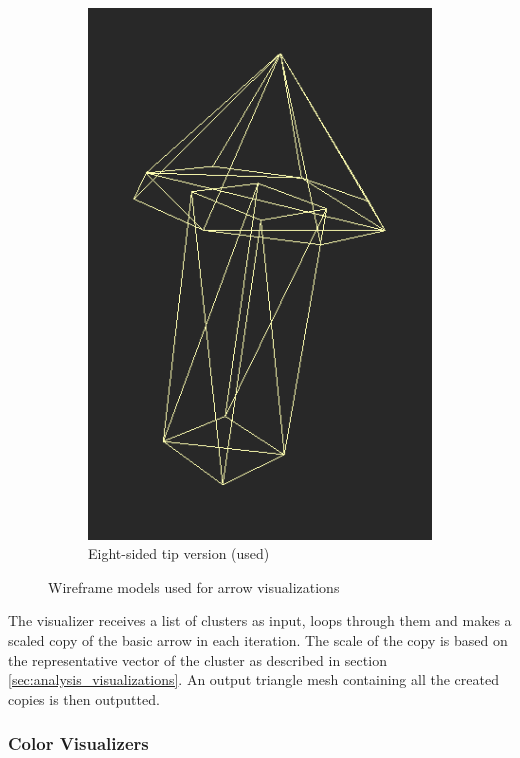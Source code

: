 \begin{figure}[h]
\begin{subfigure}{0.3\textwidth}
	\includegraphics[width=\textwidth]{./img/8sided_arrow.PNG}
    \caption{Eight-sided tip version (used)}
    \label{fig:8sided_arrow}
	\end{subfigure}
\caption{Wireframe models used for arrow visualizations}
\end{figure}

The visualizer receives a list of clusters as input, loops through them and makes a scaled copy of the basic arrow in each iteration. The scale of the copy is based on the representative vector of the cluster as described in section \ref{sec:analysis_visualizations}. An output triangle mesh containing all the created copies is then outputted.

\subsubsection{Color Visualizers}

